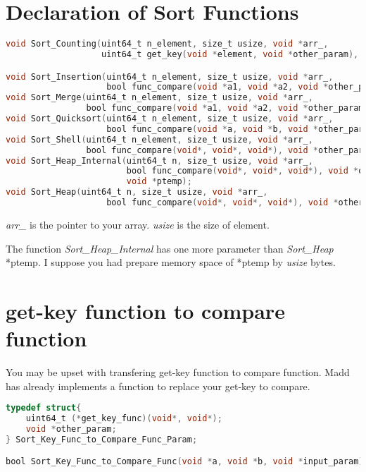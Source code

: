 \section{Declaration of Sort Functions}

\begin{lstlisting}[language=C, title={Declarations of sort functions.},]
void Sort_Counting(uint64_t n_element, size_t usize, void *arr_,
                   uint64_t get_key(void *element, void *other_param), void *other_param);

void Sort_Insertion(uint64_t n_element, size_t usize, void *arr_,
                    bool func_compare(void *a1, void *a2, void *other_param), void *other_param);
void Sort_Merge(uint64_t n_element, size_t usize, void *arr_,
                bool func_compare(void *a1, void *a2, void *other_param), void *other_param);
void Sort_Quicksort(uint64_t n_element, size_t usize, void *arr_,
                    bool func_compare(void *a, void *b, void *other_param), void *other_param);
void Sort_Shell(uint64_t n_element, size_t usize, void *arr_,
                bool func_compare(void*, void*, void*), void *other_param);
void Sort_Heap_Internal(uint64_t n, size_t usize, void *arr_,
                        bool func_compare(void*, void*, void*), void *other_param,
                        void *ptemp);
void Sort_Heap(uint64_t n, size_t usize, void *arr_,
                    bool func_compare(void*, void*, void*), void *other_param);
\end{lstlisting} 

{\it arr\_} is the pointer to your array. {\it usize} is the size of element.

The function {\it Sort\_Heap\_Internal} has one more parameter than {\it Sort\_Heap} *ptemp.
I suppose you had prepare memory space of *ptemp by {\it usize} bytes.

\section{get-key function to compare function}

You may be upset with transfering get-key function to compare function.
Madd has already implements a function to replace your get-key to compare.

\begin{lstlisting}[language=C, title={get-key function to compare function.},]
typedef struct{
    uint64_t (*get_key_func)(void*, void*);
    void *other_param;
} Sort_Key_Func_to_Compare_Func_Param;

bool Sort_Key_Func_to_Compare_Func(void *a, void *b, void *input_param);
\end{lstlisting}

